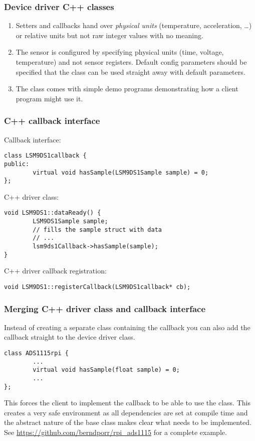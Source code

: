 \documentclass[xcolor=dvipsnames]{beamer}
\begin{document}
    

\begin{frame}[fragile]
    \frametitle{Device driver C++ classes}
\begin{enumerate}
    \item Setters and callbacks hand over \textsl{physical units}
      (temperature, acceleration, \ldots) or relative units but not raw
      integer values with no meaning.
    \item The sensor is configured by specifying physical units (time,
      voltage, temperature) and not sensor registers. Default config parameters
      should be specified that the class can be used straight away with
      default parameters.
    \item The class comes with simple demo programs demonstrating how
      a client program might use it.
    \end{enumerate}
\end{frame}
 

\begin{frame}[fragile]
    \frametitle{C++ callback interface}

Callback interface:
\begin{verbatim}
class LSM9DS1callback {
public:
        virtual void hasSample(LSM9DS1Sample sample) = 0;
};
\end{verbatim}

C++ driver class:
\begin{verbatim}
void LSM9DS1::dataReady() {
        LSM9DS1Sample sample;
        // fills the sample struct with data
        // ...
        lsm9ds1Callback->hasSample(sample);
}
\end{verbatim}

C++ driver callback registration:
\begin{verbatim}
void LSM9DS1::registerCallback(LSM9DS1callback* cb);
\end{verbatim}

\end{frame}



\begin{frame}[fragile]
    \frametitle{Merging C++ driver class and callback interface}
Instead of creating a separate class containing the callback you
can also add the callback straight to the device driver class.
\begin{verbatim}
class ADS1115rpi {
        ...
        virtual void hasSample(float sample) = 0;
        ...
};
\end{verbatim}
This forces the client to implement the callback to be able to use
the class. This creates a very safe environment as all dependencies
are set at compile time and the abstract nature of the base class
makes clear what needs to be implemented.
See
\url{https://github.com/berndporr/rpi_ads1115} for a complete example.
\end{frame}
\end{document}
